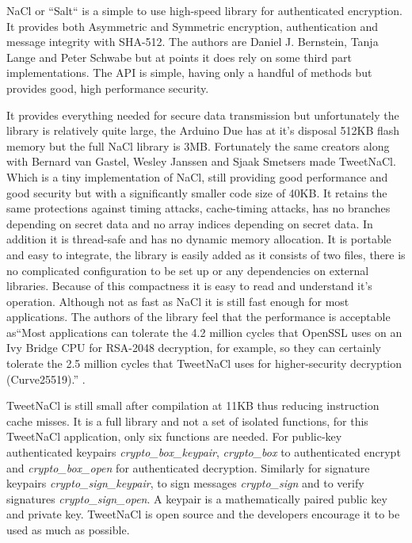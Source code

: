 NaCl or ``Salt`` is a simple to use high-speed library for authenticated encryption. It provides both Asymmetric and Symmetric encryption, authentication and message integrity with SHA-512. The authors are Daniel J. Bernstein, Tanja Lange and Peter Schwabe but at points it does rely on some third part implementations. The API is simple, having only a handful of methods but provides good, high performance security.

It provides everything needed for secure data transmission but unfortunately the library is relatively quite large, the Arduino Due has at it's disposal 512KB flash memory but the full NaCl library is 3MB. Fortunately the same creators along with Bernard van Gastel, Wesley Janssen and Sjaak Smetsers made TweetNaCl. Which is a tiny implementation of NaCl, still providing good performance and good security but with a significantly smaller code size of 40KB. It retains the same protections against timing attacks, cache-timing attacks, has no branches depending on secret data and no array indices depending on secret data. In addition it is thread-safe and has no dynamic memory allocation\cite{tweetnacl}. It is portable and easy to integrate, the library is easily added as it consists of two files, there is no complicated configuration to be set up or any dependencies on external libraries. Because of this compactness it is easy to read and understand it's operation. Although not as fast as NaCl it is still fast enough for most applications. The authors of the library feel that the performance is acceptable as``Most applications can tolerate the 4.2 million cycles that OpenSSL uses on an Ivy Bridge CPU for RSA-2048 decryption, for example, so they can certainly tolerate the 2.5 million cycles that TweetNaCl uses for higher-security decryption (Curve25519).'' \cite{tweetnacl3}.

TweetNaCl is still small after compilation at 11KB thus reducing instruction cache misses. It is a full library and not a set of isolated functions, for this TweetNaCl application, only six functions are needed. For public-key authenticated keypairs \emph{crypto\_box\_keypair}, \emph{crypto\_box} to authenticated encrypt and \emph{crypto\_box\_open} for authenticated decryption. Similarly for signature keypairs \emph{crypto\_sign\_keypair}, to sign messages \emph{crypto\_sign} and to verify signatures \emph{crypto\_sign\_open}. A keypair is a mathematically paired public key and private key. TweetNaCl is open source and the developers encourage it to be used as much as possible. 

